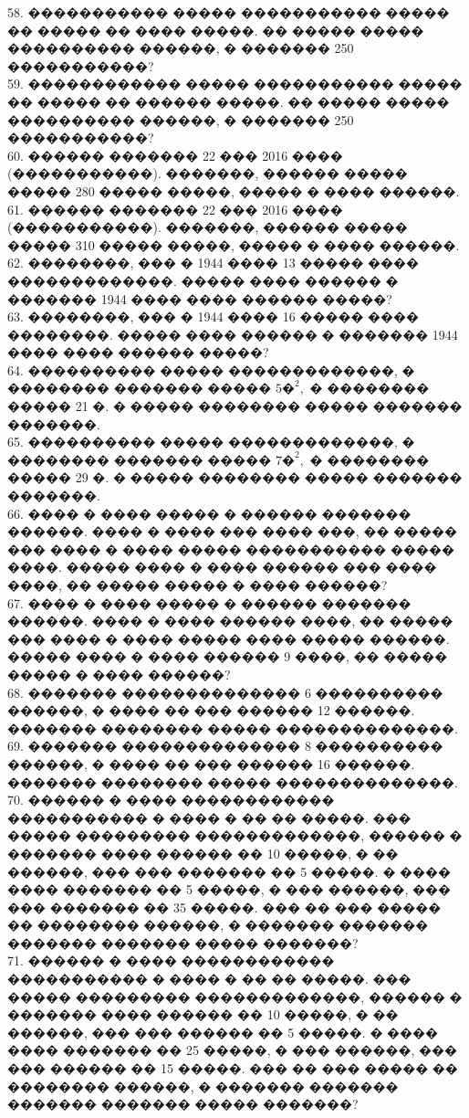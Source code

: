 \documentclass[12pt]{article}
\begin{document}
58. ����������� ����� ����������� ����� �� ����� �� ���� �����. �� ����� ����� ���������� ������, � ������� 250 �����������?\\
59. ������������ ����� ����������� ����� �� ����� �� ������ �����. �� ����� ����� ���������� ������, � ������� 250 �����������?\\
60. ������ ������� 22 ��� 2016 ���� (�����������). �������, ������ ����� ����� 280 ����� �����, ����� � ���� ������.\\
61. ������ ������� 22 ��� 2016 ���� (�����������). �������, ������ ����� ����� 310 ����� �����, ����� � ���� ������.\\
62. ��������, ��� � 1944 ���� 13 ����� ���� �������������. ����� ���� ������ � ������� 1944 ���� ���� ������ �����?\\
63. ��������, ��� � 1944 ���� 16 ����� ���� ��������. ����� ���� ������ � ������� 1944 ���� ���� ������ �����?\\
64. ���������� ����� �������������, � �������� ������� ����� $5\text{�}^2,$ � �������� ����� 21 �. � ����� �������� ����� ������� �������.\\
65. ���������� ����� �������������, � �������� ������� ����� $7\text{�}^2,$ � �������� ����� 29 �. � ����� �������� ����� ������� �������.\\
66. ���� � ���� ����� � ������ ������� ������. ���� � ���� ��� ���� ���, �� ����� ��� ���� � ���� ����� ����������� ����� ����. ����� ���� � ���� ������ ��� ���� ����, �� ����� ����� � ���� ������?\\
67. ���� � ���� ����� � ������ ������� ������. ���� � ���� ������ ����, �� ����� ��� ���� � ���� ����� ���� ����� ������. ����� ���� � ���� ������ 9 ����, �� ����� ����� � ���� ������?\\
68. ������� �������������� 6 ���������� ������, � ���� �� ��� ������ 12 ������. ������� �������� ����� ��������������.\\
69. ������� �������������� 8 ���������� ������, � ���� �� ��� ������ 16 ������. ������� �������� ����� ��������������.\\
70. ������ � ���� ������������ ����������� � ���� � �� �� �����. ��� ����� ��������� �������������, ������ � ������� ���� ������ �� 10 �����, � �� ������, ��� ��� ������� �� 5 �����. � ���� ���� ������� �� 5 �����, � ��� ������, ��� ��� ������� �� 35 �����. ��� �� ��� ����� �� �������� ������, � ������� ������� ������� ������� ����� �������?\\
71. ������ � ���� ������������ ����������� � ���� � �� �� �����. ��� ����� ��������� �������������, ������ � ������� ���� ������ �� 10 �����, � �� ������, ��� ��� ������ �� 5 �����. � ���� ���� ������� �� 25 �����, � ��� ������, ��� ��� ������ �� 15 �����. ��� �� ��� ����� �� �������� ������, � ������� ������� ������� ������� ����� �������?\\
\end{document}
